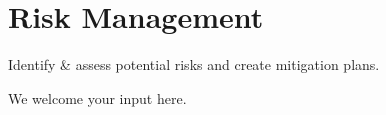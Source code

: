 \section{Risk Management}\label{sec:ekgmm-a-3-2}

Identify \& assess potential risks and create mitigation plans.

\ekgmmContextSection

We welcome your input here.

